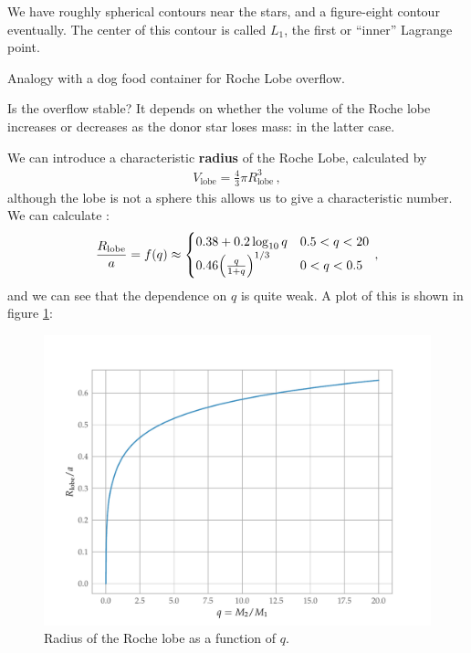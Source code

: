\documentclass[main.tex]{subfiles}
\begin{document}
We have roughly spherical contours near the stars, and a figure-eight contour eventually.
The center of this contour is called \(L_1 \), the first or ``inner'' Lagrange point. 

Analogy with a dog food container for Roche Lobe overflow.

Is the overflow stable? It depends on whether the volume of the Roche lobe increases or decreases as the donor star loses mass: in the latter case. 


We can introduce a characteristic \textbf{radius} of the Roche Lobe, calculated by 
%
\begin{align}
V _{\text{lobe}} = \frac{4}{3} \pi R _{\text{lobe}}^3
\,,
\end{align}
%
although the lobe is not a sphere this allows us to give a characteristic number. 
We can calculate \cite[]{eggletonApproximationsRadiiRoche1983}:
%
\begin{align}
\frac{R_{\text{lobe}}}{a} = f(q) \approx
\begin{cases}
    \num{.38} + \num{.2} \log_{10} q  & \num{.5} < q < \num{20}\\
    \num{.46}  \qty( \frac{q}{1 + q})^{1/3}
    & 0 < q < \num{.5}
\end{cases} 
\,,
\end{align}
%
and we can see that the dependence on \(q\) is quite weak. A plot of this is shown in figure \ref{fig:roche-lobe-radius}:
%
\begin{figure}[ht]
\centering
\includegraphics[width=\textwidth]{figures/roche-lobe-radius}
\caption{Radius of the Roche lobe as a function of \(q\).}
\label{fig:roche-lobe-radius}
\end{figure}
\end{document}
